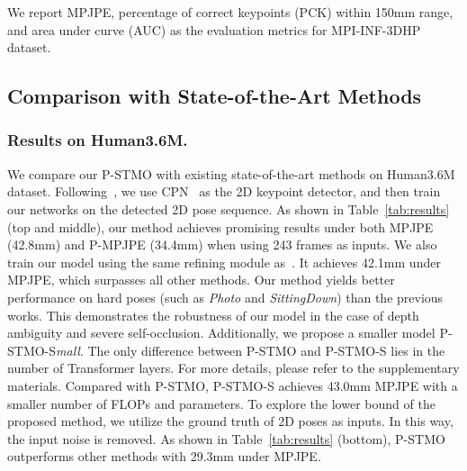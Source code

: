 \documentclass[]{llncs}
\begin{document}
We report MPJPE, percentage of correct keypoints (PCK) within 150mm range, and area under curve (AUC) as the evaluation metrics for MPI-INF-3DHP dataset.


\subsection{Comparison with State-of-the-Art Methods}

\subsubsection{Results on Human3.6M.}
We compare our P-STMO with existing state-of-the-art methods on Human3.6M dataset. Following~\cite{zheng20213d,li2022exploiting,pavllo20193d,liu2020attention}, we use CPN~\cite{chen2018cascaded} as the 2D keypoint detector, and then train our networks on the detected 2D pose sequence. As shown in Table~\ref{tab:results} (top and middle), our method achieves promising results under both MPJPE (42.8mm) and P-MPJPE (34.4mm) when using 243 frames as inputs. We also train our model using the same refining module as~\cite{li2022exploiting,cai2019exploiting,wang2020motion}. It achieves 42.1mm under MPJPE, which surpasses all other methods. Our method yields better performance on hard poses (such as \emph{Photo} and \emph{SittingDown}) than the previous works. This demonstrates the robustness of our model in the case of depth ambiguity and severe self-occlusion. Additionally, we propose a smaller model P-STMO-S\emph{mall}. The only difference between P-STMO and P-STMO-S lies in the number of Transformer layers. For more details, please refer to the supplementary materials. Compared with P-STMO, P-STMO-S achieves 43.0mm MPJPE with a smaller number of FLOPs and parameters. To explore the lower bound of the proposed method, we utilize the ground truth of 2D poses as inputs. In this way, the input noise is removed. As shown in Table~\ref{tab:results} (bottom), P-STMO outperforms other methods with 29.3mm under MPJPE.
\end{document}
